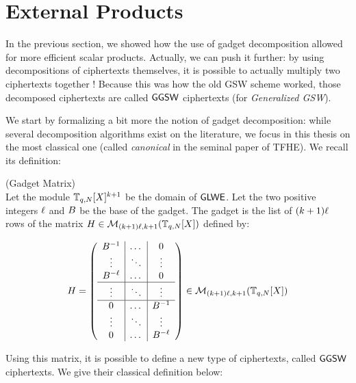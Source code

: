\section{External Products}
\label{sec:external_products}

In the previous section, we showed how the use of gadget decomposition allowed for more efficient scalar products. Actually, we can push it further: by using decompositions of ciphertexts themselves, it is possible to actually multiply two ciphertexts together ! Because this was how the old GSW scheme \cite{C:GenSahWat13} worked, those decomposed ciphertexts are called $\textsf{GGSW}$ ciphertexts (for \textit{Generalized GSW}).


We start by formalizing a bit more the notion of gadget decomposition: while several decomposition algorithms exist on the literature, we focus in this thesis on the most classical one (called \textit{canonical} in the seminal paper of TFHE). We recall its definition:

	
\begin{definition}(Gadget Matrix)\\
	Let the module $\mathbb{T}_{q, N}[X]^{k+1}$ be the domain of $\textsf{GLWE}$. Let the two positive integers $\ell$ and $B$ be the base of the gadget. The gadget is the list of $(k+1) \ell$ rows of the matrix $H \in \mathcal{M}_{(k+1)\ell, k+1}(\mathbb{T}_{q, N}[X])$ defined by:
	
	\[
	H = 
	\left(
	\begin{array}{c|c|c}
		B^{-1} & \dots & 0 \\
		\vdots & \ddots & \vdots  \\
		B^{-\ell} & \dots & 0 \\
		\hline
		\vdots & \ddots & \vdots \\
		\hline
		0 & \dots & B^{-1} \\
		\vdots & \ddots & \vdots  \\
		0 & \dots & B^{-\ell}\\
	\end{array}
	\right) \in \mathcal{M}_{(k+1)\ell, k+1}(\mathbb{T}_{q, N}[X])
	\]
\end{definition}
	


Using this matrix, it is possible to define a new type of ciphertexts, called $\textsf{GGSW}$ ciphertexts. We give their classical definition below:


